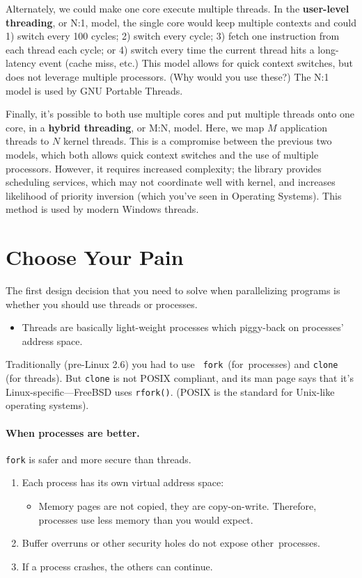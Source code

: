 \documentclass[a4paper]{report}
\begin{document}
Alternately, we could make one core execute multiple threads. In the
{\bf user-level threading}, or N:1, model, the single core would keep
multiple contexts and could 1) switch every 100 cycles; 2) switch
every cycle; 3) fetch one instruction from each thread each cycle; or
4) switch every time the current thread hits a long-latency event
(cache miss, etc.) This model allows for quick context switches, but
does not leverage multiple processors. (Why would you use these?) The N:1 model is used by
GNU Portable Threads.

Finally, it's possible to both use multiple cores and put multiple
threads onto one core, in a {\bf hybrid threading}, or M:N, model. Here, we map $M$ application threads to $N$ kernel threads. This
is a compromise between the previous two models, which both allows
quick context switches and the use of multiple processors. However, it
requires increased complexity; the library provides scheduling
services, which may not coordinate well with kernel, and increases
likelihood of priority inversion (which you've seen in Operating
Systems).  This method is used by modern Windows threads.


\section*{Choose Your Pain}
The first design decision that you need to solve when parallelizing programs
is whether you should use threads or processes.

  \begin{itemize}
    \item Threads are basically light-weight processes which piggy-back on
          processes' address space.
  \end{itemize}

Traditionally (pre-Linux 2.6) you had to use {\tt
  fork}~(for~processes) and {\tt clone} (for threads). But {\tt clone}
is not POSIX compliant, and its man page says that it's
Linux-specific---FreeBSD uses {\tt rfork()}. (POSIX is the standard
for Unix-like operating systems).

\paragraph{When processes are better.} {\tt fork} is safer and more secure than threads.

  \begin{enumerate}
    \item Each process has its own virtual address space:
      \begin{itemize}
        \item Memory pages are not copied, they are copy-on-write. Therefore, processes use less memory than you would expect.
      \end{itemize}
    \item Buffer overruns or other security holes do not expose other~processes.
    \item If a process crashes, the others can continue.
  \end{enumerate}
\end{document}

